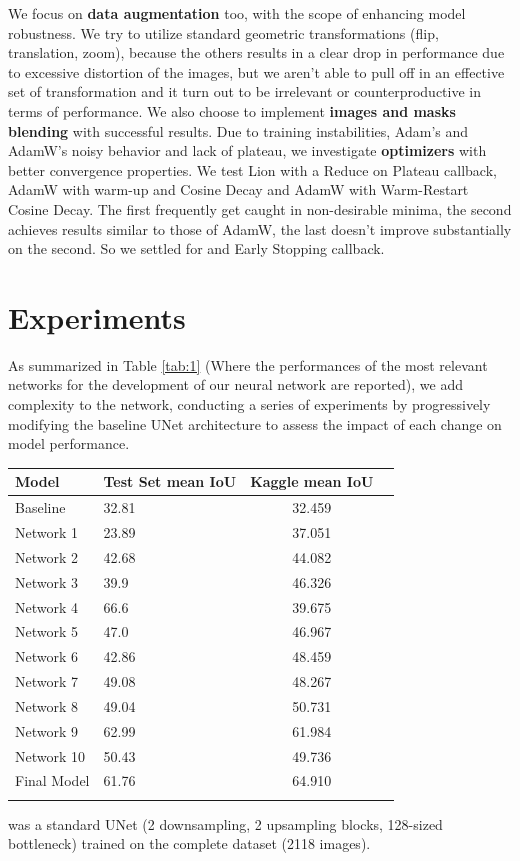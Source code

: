 \documentclass[11pt]{template}
\begin{document}
\begin{multicols}{2}
We focus on \textbf{data augmentation} too, with the scope of enhancing model robustness. We try to utilize standard geometric transformations (flip, translation, zoom), because the others results in a clear drop in performance due to excessive distortion of the images, but we aren't able to pull off in an effective set of transformation and it turn out to be irrelevant or counterproductive in terms of performance. We also choose to implement \textbf{images and masks blending} with successful results.
Due to training instabilities, Adam's and AdamW's noisy behavior and lack of plateau, we investigate \textbf{optimizers} with better convergence properties. We test Lion with a Reduce on Plateau callback, AdamW with warm-up and Cosine Decay and AdamW with Warm-Restart Cosine Decay. The first frequently get caught in non-desirable minima, the second achieves results similar to those of AdamW, the last doesn't improve substantially on the second. So we settled for  and Early Stopping callback. 

\section{Experiments}
As summarized in Table \ref{tab:1} (Where the performances of the most relevant networks for the development of our neural network are reported), we add complexity to the network, conducting a series of experiments by progressively modifying the baseline UNet architecture to assess the impact of each change on model performance.

\begin{center}
\centering
\setlength{\tabcolsep}{3pt}
\begin{tabularx}{.5\textwidth}{lYcY}
    \toprule
    Model & Test Set mean IoU & Kaggle mean IoU\\
    \midrule
    Baseline  & 32.81 & 32.459\\
    Network 1 & 23.89 & 37.051\\
    Network 2 & 42.68 & 44.082\\
    Network 3 & 39.9 & 46.326\\
    Network 4 & 66.6 & 39.675\\
    Network 5 & 47.0 & 46.967\\
    Network 6 & 42.86 & 48.459\\
    Network 7 & 49.08 & 48.267\\
    Network 8 & 49.04 & 50.731\\
    Network 9 & 62.99 & 61.984\\
    Network 10 & 50.43 & 49.736\\
    Final Model & 61.76 & 64.910\\
    \bottomrule
\end{tabularx}
\label{tab:1}
\end{center}
\begin{description}[leftmargin=!]
  \item[\textbf{Baseline Network}] was a standard UNet (2 downsampling, 2 upsampling blocks, 128-sized bottleneck) trained on the complete dataset (2118 images).
  

\end{description}
\end{multicols}
\end{document}
